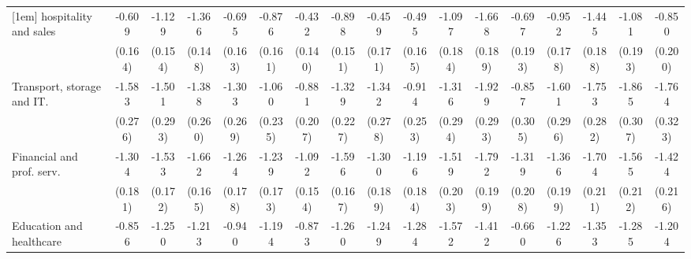 {\begin{tabular}{l*{16}{c}}
[1em]
hospitality and sales&      -0.609\sym{***}&      -1.129\sym{***}&      -1.366\sym{***}&      -0.695\sym{***}&      -0.876\sym{***}&      -0.432\sym{**} &      -0.898\sym{***}&      -0.459\sym{**} &      -0.495\sym{**} &      -1.097\sym{***}&      -1.668\sym{***}&      -0.697\sym{***}&      -0.952\sym{***}&      -1.445\sym{***}&      -1.081\sym{***}&      -0.850\sym{***}\\
                    &     (0.164)         &     (0.154)         &     (0.148)         &     (0.163)         &     (0.161)         &     (0.140)         &     (0.151)         &     (0.171)         &     (0.165)         &     (0.184)         &     (0.189)         &     (0.193)         &     (0.178)         &     (0.188)         &     (0.193)         &     (0.200)         \\
[1em]
Transport, storage and IT.&      -1.583\sym{***}&      -1.501\sym{***}&      -1.388\sym{***}&      -1.303\sym{***}&      -1.060\sym{***}&      -0.881\sym{***}&      -1.329\sym{***}&      -1.342\sym{***}&      -0.914\sym{***}&      -1.316\sym{***}&      -1.929\sym{***}&      -0.857\sym{**} &      -1.601\sym{***}&      -1.753\sym{***}&      -1.865\sym{***}&      -1.764\sym{***}\\
                    &     (0.276)         &     (0.293)         &     (0.260)         &     (0.269)         &     (0.235)         &     (0.207)         &     (0.227)         &     (0.278)         &     (0.253)         &     (0.294)         &     (0.293)         &     (0.305)         &     (0.296)         &     (0.282)         &     (0.307)         &     (0.323)         \\
[1em]
Financial and prof. serv.&      -1.304\sym{***}&      -1.533\sym{***}&      -1.662\sym{***}&      -1.264\sym{***}&      -1.239\sym{***}&      -1.092\sym{***}&      -1.596\sym{***}&      -1.300\sym{***}&      -1.196\sym{***}&      -1.519\sym{***}&      -1.792\sym{***}&      -1.319\sym{***}&      -1.366\sym{***}&      -1.704\sym{***}&      -1.565\sym{***}&      -1.424\sym{***}\\
                    &     (0.181)         &     (0.172)         &     (0.165)         &     (0.178)         &     (0.173)         &     (0.154)         &     (0.167)         &     (0.189)         &     (0.184)         &     (0.203)         &     (0.199)         &     (0.208)         &     (0.199)         &     (0.211)         &     (0.212)         &     (0.216)         \\
[1em]
Education and healthcare&      -0.856\sym{***}&      -1.250\sym{***}&      -1.213\sym{***}&      -0.940\sym{***}&      -1.194\sym{***}&      -0.873\sym{***}&      -1.260\sym{***}&      -1.249\sym{***}&      -1.284\sym{***}&      -1.572\sym{***}&      -1.412\sym{***}&      -0.660\sym{**} &      -1.226\sym{***}&      -1.353\sym{***}&      -1.285\sym{***}&      -1.204\sym{***}\\

\end{tabular}}
